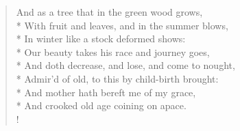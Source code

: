 \translationrule%
\begin{verse}%
And as a tree that in the green wood grows,\\*
With fruit and leaves, and in the summer blows,\\*
In winter like a stock deformed shows:\\*
Our beauty takes his race and journey goes,\\*
And doth decrease, and lose, and come to nought,\\*
Admir'd of old, to this by child-birth brought:\\*
And mother hath bereft me of my grace,\\*
And crooked old age coining on apace.\\!
\end{verse}%
%

